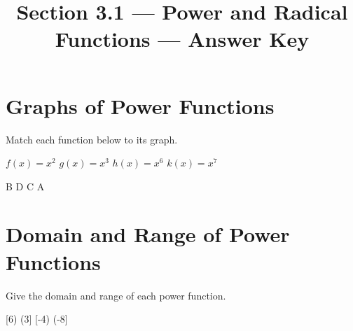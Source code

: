 

\title{Section 3.1 --- Power and Radical Functions --- Answer Key}

\NewDocumentCommand{\DomRng}{m d(] d[)}{%
$\dom #1=\eint$\\$\rng #1=%
\IfNoValueTF{#2}{%
\IfNoValueTF{#3}{%
\eint
}{
\Lint{#3}
}}{
\Rint{#2}
}$}

\newcommand{\domrng}[3]{%
$\dom #1=#2$\\$\rng #1=#3$%
}

\newlength{\lht}
\newlength{\lwid}
\newcommand{\Lboxed}[1]{%
\setlength{\lwid}{\widthof{$#1$}}
\setlength{\lht}{\heightof{ABC123}}
\begin{tikzpicture}[baseline=0]
\useasboundingbox (-0.5\lwid-3pt,0) rectangle (0.5\lwid+3pt,\lht);
\draw (0,0) node[anchor=base]{$#1$};
\draw[rounded corners=3pt] (-0.5\lwid-2pt,-3pt) rectangle (0.5\lwid+2pt,\lht+3pt);
\end{tikzpicture}%
}


\maketitle
\section*{Graphs of Power Functions}
Match each function below to its graph.
\begin{Nmenum}
\mitemxxxx
{$f(x)=x^2$}
{$g(x)=x^3$}
{$h(x)=x^6$}
{$k(x)=x^7$}
\end{Nmenum}
\begin{smenum}
\mitemxxxx
{%
B
}{%
D
}{%
C
}{%
A
}
\end{smenum}

\section*{Domain and Range of Power Functions}
Give the domain and range of each power function.
\begin{smenum}
\mitemxxx
{}
{[6)}
{}
\mitemxxx
{(3]}
{[-4)}
{(-8]}
\end{smenum}

